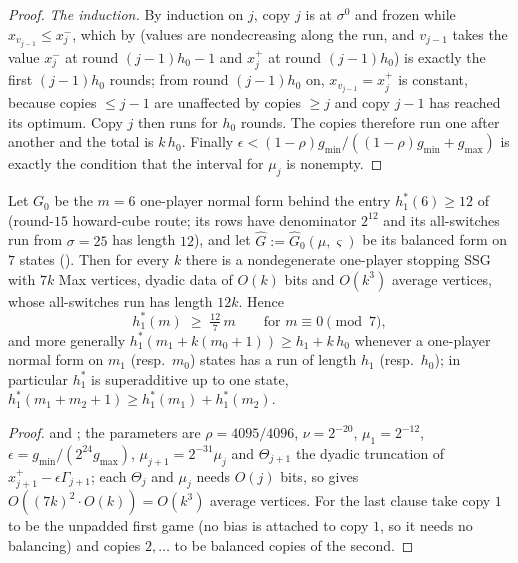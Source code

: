 \begin{proof}
\emph{The induction.} By induction on $j$, copy $j$ is at $\sigma^{0}$ and frozen while
$x_{v_{j-1}}\le x^{-}_j$, which by  (values are nondecreasing along the
run, and $v_{j-1}$ takes the value $x^{-}_j$ at round $(j-1)h_0-1$ and $x^{+}_j$ at
round $(j-1)h_0$) is exactly the first $(j-1)h_0$ rounds; from round $(j-1)h_0$ on,
$x_{v_{j-1}}=x^{+}_j$ is constant, because copies $\le j-1$ are unaffected by copies
$\ge j$ and copy $j-1$ has reached its optimum. Copy $j$ then runs for $h_0$ rounds.
The copies therefore run one after another and the total is $k\,h_0$. Finally
$\epsilon<(1-\rho)g_{\min}/((1-\rho)g_{\min}+g_{\max})$ is exactly the condition that
the interval for $\mu_j$ is nonempty.
\end{proof}

\begin{corollary}\label{oph:family}
Let $G_0$ be the $m=6$ one-player normal form behind the entry
$h^{\ast}_{1}(6)\ge12$ of  (round-$15$ howard-cube route; its
rows have denominator $2^{12}$ and its all-switches run from $\sigma=25$ has length
$12$), and let $\widehat G:=\widehat G_0(\mu,\varsigma)$ be its balanced form on $7$
states (). Then for every $k$ there is a nondegenerate one-player
stopping SSG with $7k$ Max vertices, dyadic data of $O(k)$ bits and $O(k^{3})$ average
vertices, whose all-switches run has length $12k$. Hence
\[
  h^{\ast}_{1}(m)\;\ge\;\tfrac{12}{7}\,m\qquad\text{for } m\equiv0 \pmod 7 ,
\]
and more generally $h^{\ast}_{1}(m_1+k(m_0+1))\ge h_1+k\,h_0$ whenever a one-player
normal form on $m_1$ (resp.\ $m_0$) states has a run of length $h_1$ (resp.\ $h_0$);
in particular $h^{\ast}_{1}$ is superadditive up to one state,
$h^{\ast}_{1}(m_1+m_2+1)\ge h^{\ast}_{1}(m_1)+h^{\ast}_{1}(m_2)$.
\end{corollary}

\begin{proof}
 and ; the parameters are
$\rho=4095/4096$, $\nu=2^{-20}$, $\mu_1=2^{-12}$,
$\epsilon=g_{\min}/(2^{24}g_{\max})$, $\mu_{j+1}=2^{-31}\mu_j$ and $\Theta_{j+1}$ the
dyadic truncation of $x^{+}_{j+1}-\epsilon\Gamma_{j+1}$; each $\Theta_j$ and $\mu_j$
needs $O(j)$ bits, so  gives $O((7k)^2\cdot O(k))=O(k^{3})$
average vertices. For the last clause take copy $1$ to be the unpadded first game (no
bias is attached to copy $1$, so it needs no balancing) and copies $2,\dots$ to be
balanced copies of the second.
\end{proof}

